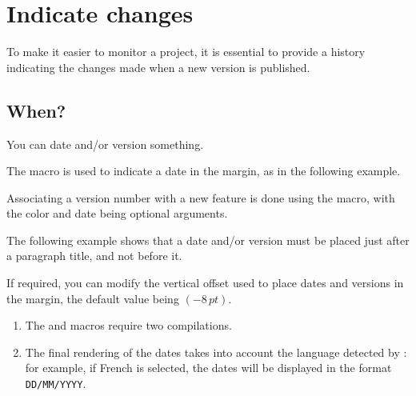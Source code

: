 \documentclass{tutodoc}
\begin{document}
\section{Indicate changes}
\label{tutodoc-changes}

To make it easier to monitor a project, it is essential to provide a history indicating the changes made when a new version is published.



\subsection{When?}
\label{tutodoc-changes-when}

You can date and/or version something.


\begin{tdocexa}
    The  macro is used to indicate a date in the margin, as in the following example.

\end{tdocexa}


\begin{tdocexa}
    Associating a version number with a new feature is done using the  macro, with the color and date being optional arguments.

\end{tdocexa}


\begin{tdocexa}
	The following example shows that a date and/or version must be placed just after a paragraph title, and not before it.

\end{tdocexa}


\begin{tdocexa}
	If required, you can modify the vertical offset used to place dates and versions in the margin, the default value being $(-8\,\mathit{pt})$.

\end{tdocexa}


\begin{tdocimp}
    \begin{enumerate}[wide]
        \item The  and  macros require two compilations.

        \item The final rendering of the dates takes into account the language detected by \thisproj{}: for example, if French is selected, the dates will be displayed in the format \texttt{DD/MM/YYYY}.
    \end{enumerate}
\end{tdocimp}
\end{document}
